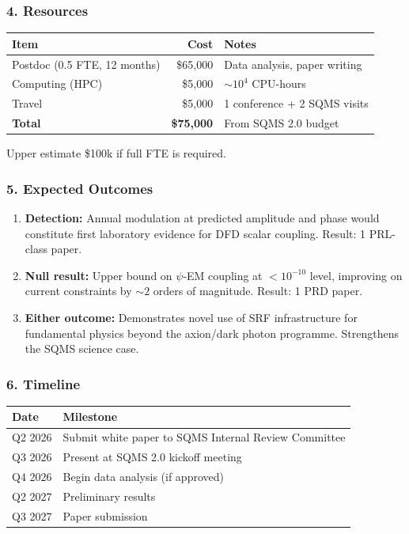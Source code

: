 \documentclass[11pt,a4paper]{article}
\begin{document}
\subsubsection*{4. Resources}

\begin{center}
\begin{tabular}{lrl}
\toprule
\textbf{Item} & \textbf{Cost} & \textbf{Notes} \\
\midrule
Postdoc (0.5 FTE, 12 months) & \$65,000 & Data analysis, paper writing \\
Computing (HPC) & \$5,000 & $\sim 10^4$ CPU-hours \\
Travel & \$5,000 & 1 conference + 2 SQMS visits \\
\midrule
\textbf{Total} & \textbf{\$75,000} & From SQMS 2.0 budget \\
\bottomrule
\end{tabular}
\end{center}

Upper estimate \$100k if full FTE is required.

\subsubsection*{5. Expected Outcomes}

\begin{enumerate}
\item \textbf{Detection:} Annual modulation at predicted amplitude and phase would constitute first laboratory evidence for DFD scalar coupling. Result: 1 PRL-class paper.
\item \textbf{Null result:} Upper bound on $\psi$-EM coupling at $< 10^{-10}$ level, improving on current constraints by $\sim 2$ orders of magnitude. Result: 1 PRD paper.
\item \textbf{Either outcome:} Demonstrates novel use of SRF infrastructure for fundamental physics beyond the axion/dark photon programme. Strengthens the SQMS science case.
\end{enumerate}

\subsubsection*{6. Timeline}

\begin{center}
\begin{tabular}{ll}
\toprule
\textbf{Date} & \textbf{Milestone} \\
\midrule
Q2 2026 & Submit white paper to SQMS Internal Review Committee \\
Q3 2026 & Present at SQMS 2.0 kickoff meeting \\
Q4 2026 & Begin data analysis (if approved) \\
Q2 2027 & Preliminary results \\
Q3 2027 & Paper submission \\
\bottomrule
\end{tabular}
\end{center}
\end{document}

